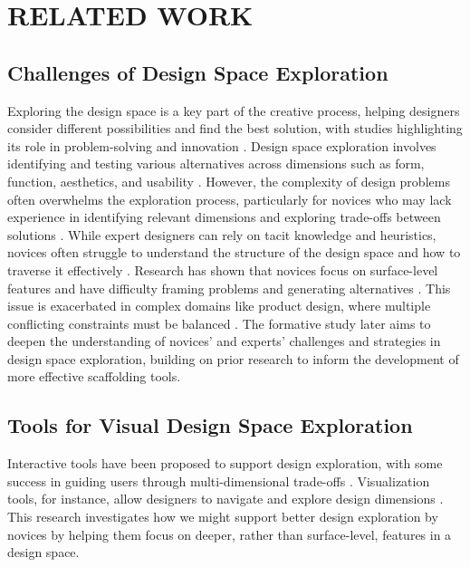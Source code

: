 \section{RELATED WORK}
\subsection{Challenges of Design Space Exploration}
Exploring the design space is a key part of the creative process, helping designers consider different possibilities and find the best solution, with studies highlighting its role in problem-solving and innovation \cite{maher1996modeling, dorst2001creativity}. Design space exploration involves identifying and testing various alternatives across dimensions such as form, function, aesthetics, and usability \cite{yilmaz2015design}. However, the complexity of design problems often overwhelms the exploration process, particularly for novices who may lack experience in identifying relevant dimensions and exploring trade-offs between solutions \cite{march1991exploration}. While expert designers can rely on tacit knowledge and heuristics, novices often struggle to understand the structure of the design space and how to traverse it effectively \cite{ahmed2003understanding}. Research has shown that novices focus on surface-level features and have difficulty framing problems and generating alternatives \cite{goel1992structure, atman1999comparison}. This issue is exacerbated in complex domains like product design, where multiple conflicting constraints must be balanced \cite{lawson2006how}. The formative study later aims to deepen the understanding of novices' and experts' challenges and strategies in design space exploration, building on prior research to inform the development of more effective scaffolding tools.

\subsection{Tools for Visual Design Space Exploration}
Interactive tools have been proposed to support design exploration, with some success in guiding users through multi-dimensional trade-offs \cite{frich2021digital}. Visualization tools, for instance, allow designers to navigate and explore design dimensions \cite{buxton2007sketching, kang2021metamap, suh2024luminate}. This research investigates how we might support better design exploration by novices by helping them focus on deeper, rather than surface-level, features in a design space.


